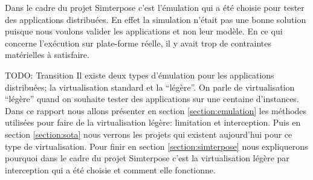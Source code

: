 Dans le cadre du projet Simterpose c'est l'émulation qui a été choisie pour tester des applications distribuées. En effet la simulation n'était pas une bonne solution puisque nous voulons valider les applications et non leur modèle. En ce qui concerne l'exécution sur plate-forme réelle, il y avait trop de contraintes matérielles à satisfaire.

{\color{red}TODO: Transition}
Il existe deux types d'émulation pour les applications distribuées; la virtualisation standard et la ``légère''. On parle de virtualisation ``légère'' quand on souhaite tester des applications sur une centaine d'instances. Dans ce rapport nous allons présenter en section \ref{section:emulation} les méthodes utilisées pour faire de la virtualisation légère: limitation et interception. Puis en section \ref{section:sota} nous verrons les projets qui existent aujourd'hui pour ce type de virtualisation. Pour finir en section \ref{section:simterpose} nous expliquerons pourquoi dans le cadre du projet Simterpose c'est la virtualisation légère par interception qui a été choisie et comment elle fonctionne.
